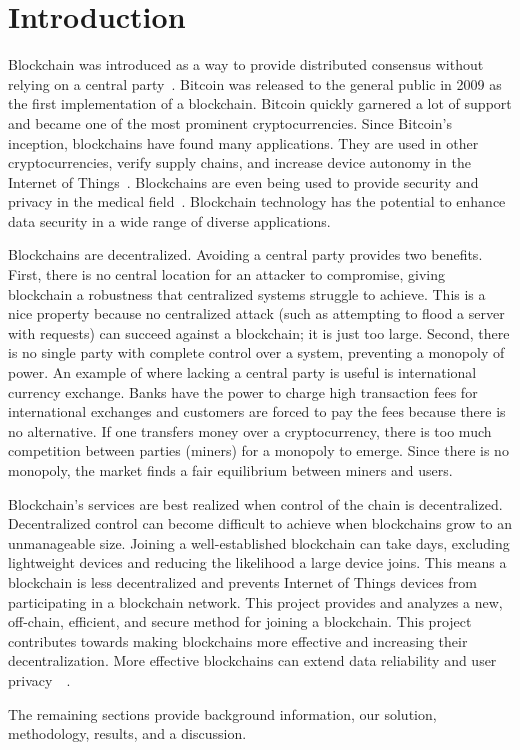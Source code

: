 \section{Introduction}
\label{sec:introduction}



Blockchain was introduced as a way to provide distributed consensus without relying on a central party~\cite{nakamoto2009Bitcoin}.
Bitcoin was released to the general public in 2009 as the first implementation of a blockchain.
Bitcoin quickly garnered a lot of support and became one of the most prominent cryptocurrencies.
Since Bitcoin's inception, blockchains have found many applications.
They are used in other cryptocurrencies, verify supply chains, and increase device autonomy in the Internet of Things~\cite{cai2018DecentralizedApplications}.
Blockchains are even being used to provide security and privacy in the medical field~\cite{siyal2019MedicalApplications}.
Blockchain technology has the potential to enhance data security in a wide range of diverse applications.

Blockchains are decentralized.
Avoiding a central party provides two benefits.
First, there is no central location for an attacker to compromise, giving blockchain a robustness that centralized systems struggle to achieve.
This is a nice property because no centralized attack (such as attempting to flood a server with requests) can succeed against a blockchain; it is just too large.
Second, there is no single party with complete control over a system, preventing a monopoly of power.
An example of where lacking a central party is useful is international currency exchange.
Banks have the power to charge high transaction fees for international exchanges and customers are forced to pay the fees because there is no alternative.
If one transfers money over a cryptocurrency, there is too much competition between parties (miners) for a monopoly to emerge.
Since there is no monopoly, the market finds a fair equilibrium between miners and users.

Blockchain’s services are best realized when control of the chain is decentralized.
Decentralized control can become difficult to achieve when blockchains grow to an unmanageable size.
Joining a well-established blockchain can take days, excluding lightweight devices and reducing the likelihood a large device joins.
This means a blockchain is less decentralized and prevents Internet of Things devices from participating in a blockchain network.
This project provides and analyzes a new, off-chain, efficient, and secure method for joining a blockchain.
This project contributes towards making blockchains more effective and increasing their decentralization.
More effective blockchains can extend data reliability and user privacy~\cite{cai2018DecentralizedApplications}~\cite{siyal2019MedicalApplications}.

The remaining sections provide background information, our solution, methodology, results, and a discussion.

